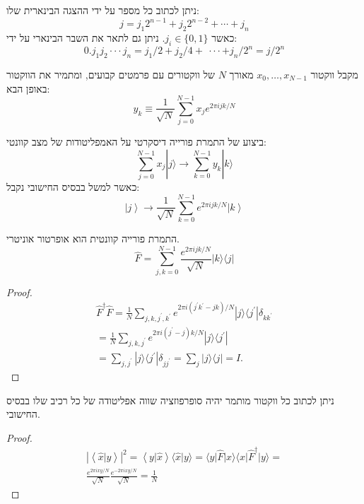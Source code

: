\documentclass{tstextbook}
\begin{document}
\begin{definition}
ניתן לכתוב כל מספר על ידי ההצגה הבינארית שלו:
$$j=j_{1}2^{n-1}+j_{2}2^{n-2}+\cdots+j_{n}$$
כאשר \(j_{i} \in \{ 0,1 \}\). ניתן גם לתאר את השבר הבינארי על ידי:
$$0.j_{1}j_{2}\cdot\cdot\cdot j_{n}=j_{1}/2+j_{2}/4+\ \cdot\cdot\cdot+j_{n}/2^{n}=j/2^{n}$$

\end{definition}
\begin{definition}
מקבל ווקטור \(x_{0},\dots,x_{N-1}\) מאורך \(N\) של ווקטורים עם פרמטים קבועים, ומתמיר את הווקטור באופן הבא:
$$y_{k}\equiv\frac{1}{\sqrt{N}}\sum_{j=0}^{N-1}x_{j}e^{2\pi i j k/N}$$

\end{definition}
\begin{definition}
ביצוע של התמרת פורייה דיסקרטי על האמפליטודות של מצב קוונטי:
$$\sum_{j=0}^{N-1}x_{j}|j\rangle\longrightarrow\sum_{k=0}^{N-1}y_{k}|k\rangle$$
כאשר למשל בבסיס החישובי נקבל:
$$\left|j\right\rangle\longrightarrow\frac{1}{\sqrt{N}}\sum_{k=0}^{N-1}e^{2\pi i j k/N}\left|k\right\rangle$$

\end{definition}
\begin{proposition}
התמרת פורייה קוונטית הוא אופרטור אוניטרי.
$$\hat{F}=\sum_{j,k=0}^{N-1}\frac{e^{2\pi i j k/N}}{\sqrt{N}}|k\rangle\langle j|$$

\end{proposition}
\begin{proof}
$$\begin{gather}{{\hat{F}^{\dagger}\hat{F}}}={{\frac{1}{N}\sum_{j,k,j^{\prime},k^{\prime}}e^{2\pi i(j^{\prime}k^{\prime}-j k)/N}|j\rangle\langle j^{\prime}|\delta_{k k^{\prime}}}}\\ ={{\frac{1}{N}\sum_{j,k,j^{\prime}}e^{2\pi i(j^{\prime}-j)k/N}|j\rangle\langle j^{\prime}|}}\\ ={{\sum_{j,j^{\prime}}|j\rangle\langle j^{\prime}|\delta_{j j^{\prime}}=\sum_{j}|j\rangle\langle j|=\hat{I}.}} 
\end{gather}$$

\end{proof}
\begin{proposition}
ניתן לכתוב כל ווקטור מותמר יהיה סופרפוזציה שווה אפליטודה של כל רכיב שלו בבסיס החישובי.

\end{proposition}
\begin{proof}
$$\begin{gather}{|\!\left\langle \hat{x}|y \right\rangle|^{2}}={{\left\langle  y|\hat{x} \right\rangle\langle \hat{x}|y \rangle=\langle  y|\hat{F}|x \rangle\langle  x|\hat{F}^{\dagger}|y \rangle}} = \\\frac{e^{ 2\pi ixy/ N }}{\sqrt{ N }}\frac{e^{ -2\pi ixy/ N }}{\sqrt{ N }}=\frac{1}{N}
\end{gather}$$

\end{proof}
\end{document}
